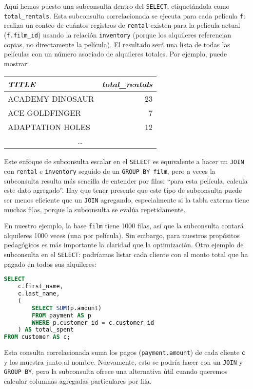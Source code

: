 \documentclass[12pt,a4paper]{article}
\begin{document}
Aquí hemos puesto una subconsulta dentro del \texttt{SELECT}, etiquetándola como \texttt{total\_rentals}.
%
Esta subconsulta correlacionada se ejecuta para cada película \texttt{f}: realiza un conteo de cuántos registros de \texttt{rental} existen para la película actual (\texttt{f.film\_id}) usando la relación \texttt{inventory} (porque los alquileres referencian copias, no directamente la película).
%
El resultado será una lista de todas las películas con un número asociado de alquileres totales.
%
Por ejemplo, puede mostrar: 


\begin{center}
\begin{tabular}{l r}
\textit{TITLE} & \textit{total\_rentals} \\ \hline
ACADEMY DINOSAUR & 23 \\
ACE GOLDFINGER & 7 \\
ADAPTATION HOLES & 12 \\
\multicolumn{2}{c}{\dots}
\end{tabular}
\end{center} 

Este enfoque de subconsulta escalar en el \texttt{SELECT} es equivalente a hacer un \texttt{JOIN} con \texttt{rental} e \texttt{inventory} seguido de un \texttt{GROUP BY film}, pero a veces la subconsulta resulta más sencilla de entender por filas: “para esta película, calcula este dato agregado”.
%
Hay que tener presente que este tipo de subconsulta puede ser menos eficiente que un \texttt{JOIN} agregando, especialmente si la tabla externa tiene muchas filas, porque la subconsulta se evalúa repetidamente.

En nuestro ejemplo, la base \texttt{film} tiene 1000 filas, así que la subconsulta contará alquileres 1000 veces (una por película).
%
Sin embargo, para nuestros propósitos pedagógicos es más importante la claridad que la optimización.
%
Otro ejemplo de subconsulta en el \texttt{SELECT}: podríamos listar cada cliente con el monto total que ha pagado en todos sus alquileres: 


\begin{lstlisting}[language=SQL]
SELECT
	c.first_name, 
	c.last_name,
	(
		SELECT SUM(p.amount)
		FROM payment AS p
		WHERE p.customer_id = c.customer_id
	) AS total_spent
FROM customer AS c;
\end{lstlisting}


Esta consulta correlacionada suma los pagos (\texttt{payment.amount}) de cada cliente \texttt{c} y los muestra junto al nombre.
%
Nuevamente, esto se podría hacer con un \texttt{JOIN} y \texttt{GROUP BY}, pero la subconsulta ofrece una alternativa útil cuando queremos calcular columnas agregadas particulares por fila.
\end{document}
